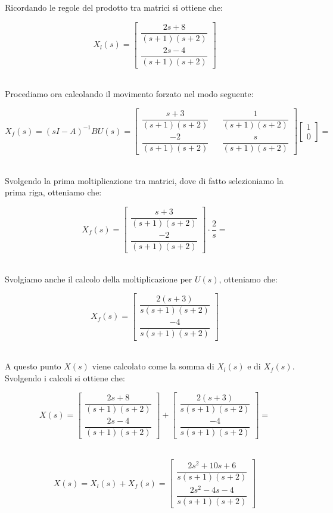 \documentclass[../main.tex]{subfiles}
\begin{document}
Ricordando le regole del prodotto tra matrici si ottiene che:

\[ X_l(s) = \begin{bmatrix} \dfrac{2s + 8}{(s+1)(s+2)} \\[1em] 
	\dfrac{2s - 4}{(s+1)(s+2)}  \end{bmatrix} \]\


Procediamo ora calcolando il movimento forzato nel modo seguente:

\[X_f(s) = (sI-A)^{-1} BU(s) =  
\begin{bmatrix}
\dfrac{s+3}{(s+1)(s+2)} && \dfrac{1}{(s+1)(s+2)} \\[1em]
\dfrac{-2}{(s+1)(s+2)} && \dfrac{s}{(s+1)(s+2)}
\end{bmatrix} \begin{bmatrix} 1 \\ 0 
\end{bmatrix} = \]\	

Svolgendo la prima moltiplicazione tra matrici, dove di fatto selezioniamo la prima riga, otteniamo che:

\[X_f(s) = 
\begin{bmatrix} 
\dfrac{s+3}{(s+1)(s+2)} \\[1em] 
\dfrac{-2}{(s+1)(s+2)}
\end{bmatrix} \cdot \frac{2}{s} = \]\

Svolgiamo anche il calcolo della moltiplicazione per $U(s)$, otteniamo che:

\[ X_f(s) = 
\begin{bmatrix} 
\dfrac{2(s+3)}{s(s+1)(s+2)} \\[1em] 
\dfrac{-4}{s(s+1)(s+2)}
\end{bmatrix}  \]\

A questo punto $X(s)$ viene calcolato come la somma di $X_l(s)$ e di $X_f(s)$.
Svolgendo i calcoli si ottiene che:

\[X(s) = \begin{bmatrix} \dfrac{2s + 8}{(s+1)(s+2)} \\[1em] 
	\dfrac{2s - 4}{(s+1)(s+2)}  \end{bmatrix}  +   \begin{bmatrix} \dfrac{2(s+3)}{s(s+1)(s+2)} \\[1em] \dfrac{-4}{s(s+1)(s+2)} \end{bmatrix}  = \]\
	
\[ X(s) = X_l(s) + X_f(s) = \begin{bmatrix} \dfrac{2s^2 + 10s + 6}{s(s+1)(s+2)} \\[1em] \dfrac{2s^2-4s-4}{s(s+1)(s+2)} 
\end{bmatrix} \]\	
\end{document}
